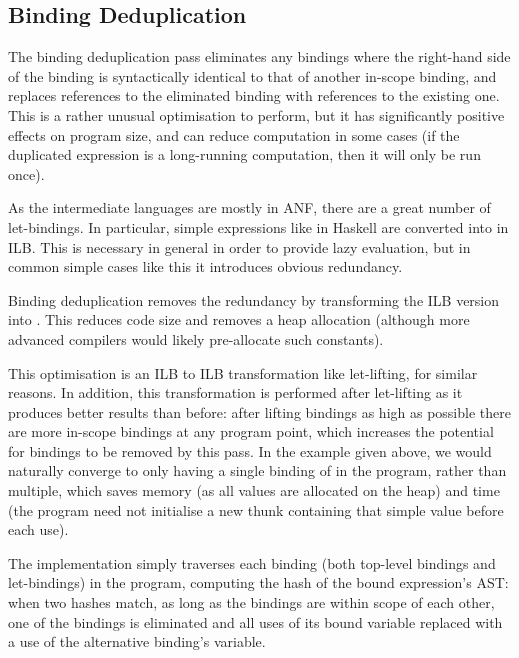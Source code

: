 \documentclass[dissertation.tex]{subfiles}
\begin{document}
{    \subsection{Binding Deduplication}\label{sec:binding-dedupe}
    {
        The binding deduplication pass eliminates any bindings where the right-hand side of the binding is syntactically identical to that of another in-scope binding, and replaces references to the eliminated binding with references to the existing one. This is a rather unusual optimisation to perform, but it has significantly positive effects on program size, and can reduce computation in some cases (if the duplicated expression is a long-running computation, then it will only be run once).

        As the intermediate languages are mostly in ANF, there are a great number of let-bindings. In particular, simple expressions like  in Haskell are converted into  in ILB. This is necessary in general in order to provide lazy evaluation, but in common simple cases like this it introduces obvious redundancy.
        
        Binding deduplication removes the redundancy by transforming the ILB version into . This reduces code size and removes a heap allocation (although more advanced compilers would likely pre-allocate such constants).

        This optimisation is an ILB to ILB transformation like let-lifting, for similar reasons. In addition, this transformation is performed after let-lifting as it produces better results than before: after lifting bindings as high as possible there are more in-scope bindings at any program point, which increases the potential for bindings to be removed by this pass. In the  example given above, we would naturally converge to only having a single binding of  in the program, rather than multiple, which saves memory (as all values are allocated on the heap) and time (the program need not initialise a new thunk containing that simple value before each use).

        The implementation simply traverses each binding (both top-level bindings and let-bindings) in the program, computing the hash of the bound expression's AST: when two hashes match, as long as the bindings are within scope of each other, one of the bindings is eliminated and all uses of its bound variable replaced with a use of the alternative binding's variable.
    }
}
\end{document}
